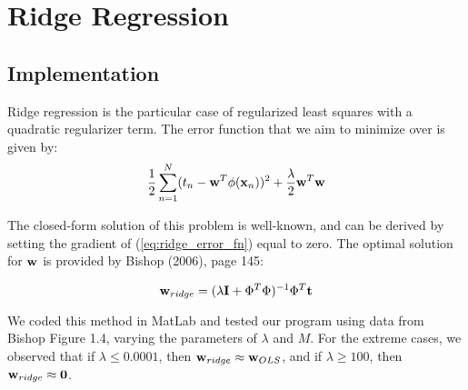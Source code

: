 
\section{Ridge Regression}\label{sec:ridge_reg}

\subsection{Implementation}
Ridge regression is the particular case of regularized least squares with a quadratic regularizer term.  The error function that we aim to minimize over is given by:
\begin{equation} \label{eq:ridge_error_fn}
\frac{1}{2} \sum_{n=1}^{N} (t_n - \boldsymbol{\mathbf{w}}^T \phi (\boldsymbol{\mathbf{x}}_n) )^2 + \frac{\lambda}{2} \boldsymbol{\mathbf{w}}^T \boldsymbol{\mathbf{w}}
\end{equation}

The closed-form solution of this problem is well-known, and can be derived by setting the gradient of (\ref{eq:ridge_error_fn}) equal to zero.  The optimal solution for $\boldsymbol{\mathbf{w}}$ is provided by Bishop (2006), page 145:

\begin{equation} \label{eq:ridge_sol}
\boldsymbol{\mathbf{w}}_{ridge} = (\lambda \boldsymbol{\mathbf{I}} + \Phi^T \Phi)^{-1} \Phi^T \boldsymbol{\mathbf{t}}
\end{equation}

We coded this method in MatLab and tested our program using data from Bishop Figure 1.4, varying the parameters of $\lambda$ and $M$.  For the extreme cases, we observed that if $\lambda \leq 0.0001$, then $\boldsymbol{\mathbf{w}}_{ridge} \approx \boldsymbol{\mathbf{w}}_{OLS}$, and if $\lambda \geq 100$, then $\boldsymbol{\mathbf{w}}_{ridge} \approx \boldsymbol{\mathbf{0}}$.




